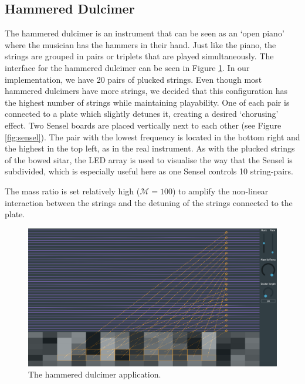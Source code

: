\documentclass{article}
\begin{document}
\subsection{Hammered Dulcimer}
The hammered dulcimer is an instrument that can be seen as an `open piano' where the musician has the hammers in their hand. Just like the piano, the strings are grouped in pairs or triplets
that are played simultaneously. 
The interface for the hammered dulcimer can be seen in Figure  \ref{fig:dulcimer}.
In our implementation, we have 20 pairs of plucked strings. Even though most hammered dulcimers have more strings, we decided that this configuration has the highest number of strings while maintaining playability. One of each pair is connected to a plate which slightly detunes it, creating a desired `chorusing' effect. 
Two Sensel boards are placed vertically next to each other (see Figure \ref{fig:sensel}). The pair with the lowest frequency is located in the bottom right and the highest in the top left, as in the real instrument. As with the plucked strings of the bowed sitar, the LED array is used to visualise the way that the Sensel is subdivided, which is especially useful here as one Sensel controls 10 string-pairs. 

The mass ratio is set relatively high ($\mathcal{M} = 100$) to amplify the non-linear interaction between the strings and the detuning of the strings connected to the plate. 

\begin{figure}[h]
\centering
\includegraphics[width=1.0\columnwidth]{dulcimer.png}
\caption{The hammered dulcimer application. \label{fig:dulcimer}}
\end{figure}
\end{document}
